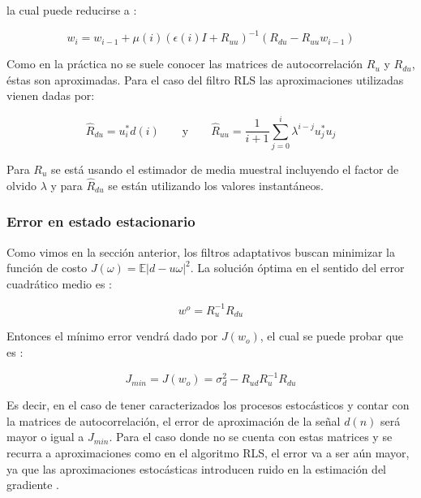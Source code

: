 \noindent la cual puede reducirse a \cite{fundamentals_of_adaptive_filtering}:

\begin{equation*}
	w_i = w_{i-1} + \mu(i) (\epsilon(i) I + R_{uu} )^{-1} \left( R_{du} - R_{uu} w_{i-1} \right)
\end{equation*}

Como en la práctica no se suele conocer las matrices de autocorrelación $R_u$ y $R_{du}$, éstas son aproximadas. Para el caso del filtro RLS las aproximaciones utilizadas vienen dadas por:

\begin{equation*}
	\hat{R}_{du} = u_i^* d(i) \qquad \text{y} \qquad \hat{R}_{uu} = \frac{1}{i+1} \sum_{j=0}^{i} \lambda^{i-j} u_j^* u_j
\end{equation*}

Para $R_u$ se está usando el estimador de media muestral incluyendo el factor de olvido $\lambda$ y para $\hat{R}_{du}$ se están utilizando los valores instantáneos.

\subsubsection{Error en estado estacionario}
\label{sec:adaptive_filter_stationary_error}

Como vimos en la sección anterior, los filtros adaptativos buscan minimizar la función de costo $J(\omega) = \mathbb{E} | d - u \omega |^2$. La solución óptima en el sentido del error cuadrático medio es \cite{fundamentals_of_adaptive_filtering}:

\begin{equation*}
	w^o = R_u^{-1}R_{du}
\end{equation*}

Entonces el mínimo error vendrá dado por $J(w_o)$, el cual se puede probar que es \cite{fundamentals_of_adaptive_filtering}:

\begin{equation*}
	J_{min} = J(w_o) = \sigma_d^2 - R_{ud} R_{u}^{-1} R_{du}
\end{equation*}

Es decir, en el caso de tener caracterizados los procesos estocásticos y contar con la matrices de autocorrelación, el error de aproximación de la señal $d(n)$ será mayor o igual a $J_{min}$. Para el caso donde no se cuenta con estas matrices y se recurra a aproximaciones como en el algoritmo RLS, el error va a ser aún mayor, ya que las aproximaciones estocásticas introducen ruido en la estimación del gradiente \cite{fundamentals_of_adaptive_filtering}.

